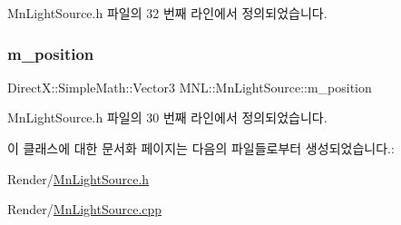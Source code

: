 Mn\+Light\+Source.\+h 파일의 32 번째 라인에서 정의되었습니다.

\mbox{\label{class_m_n_l_1_1_mn_light_source_ad593da80c4bc4a66399facf65d015edf}} 
\subsubsection{\texorpdfstring{m\+\_\+position}{m\_position}}
{\footnotesize\ttfamily Direct\+X\+::\+Simple\+Math\+::\+Vector3 M\+N\+L\+::\+Mn\+Light\+Source\+::m\+\_\+position\hspace{0.3cm}{\ttfamily [private]}}



Mn\+Light\+Source.\+h 파일의 30 번째 라인에서 정의되었습니다.



이 클래스에 대한 문서화 페이지는 다음의 파일들로부터 생성되었습니다.\+:\begin{DoxyCompactItemize}
\item 
Render/\hyperlink{_mn_light_source_8h}{Mn\+Light\+Source.\+h}\item 
Render/\hyperlink{_mn_light_source_8cpp}{Mn\+Light\+Source.\+cpp}\end{DoxyCompactItemize}
